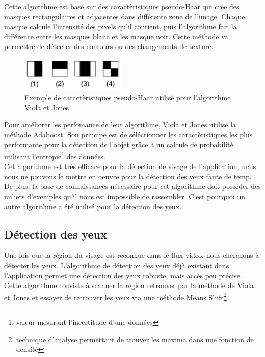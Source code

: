 Cette algorithme est basé sur des caractèristiques pseudo-Haar qui crée des masques rectangulaires et adjacentes
dans différente zone de l'image. Chaque masque calcule l'intensité des pixels qu'il contient, puis l'algorithme fait
la différence entre les masques blanc et les masque noir. Cette méthode va permettre de détecter des contours ou des changements de 
texture.\\

\begin{figure}[H]
\center
\includegraphics[width=5cm]{image/pseudo_haar.png}
\caption{Exemple de caractèristiques pseudo-Haar utilisé pour l'algorithme Viola et Jones}
\end{figure}

Pour améliorer les perfomance de leur algorithme, Viola et Jones utilise la méthode Adaboost. Son
principe est de séléctionner les caractèristiques les plus performante pour la détection de l'objet grâce à
un calcule de probabilité utilisant l'entropie\footnote{valeur mesurant l'incertitude d'une données} des données.\\

Cet algorithme est très efficace pour la détection de visage de l'application, mais nous ne pouvons le mettre
en oeuvre pour la détection des yeux faute de temp. De plus, la base de connaissances nécessaire pour cet 
algorithme doit posséder des miliers d'exemples qu'il nous est impossible de rassembler. C'est pourquoi
un autre algorithme a été utilisé pour la détection des yeux.

\subsection{Détection des yeux}
Une fois que la région du visage est reconnue dans le flux vidéo, nous cherchons à détecter les yeux. 
L'algorithme de détection des yeux déjà existant dans l'application permet une détection des yeux 
robuste, mais accès peu précise. Cette algorithme consiste à scanner la région retrouver par la 
méthode de Viola et Jones et essayer de retrouver les yeux via une méthode Means Shift\footnote{technique 
d'analyse permettant de trouver les maxima dans une fonction de densité}




